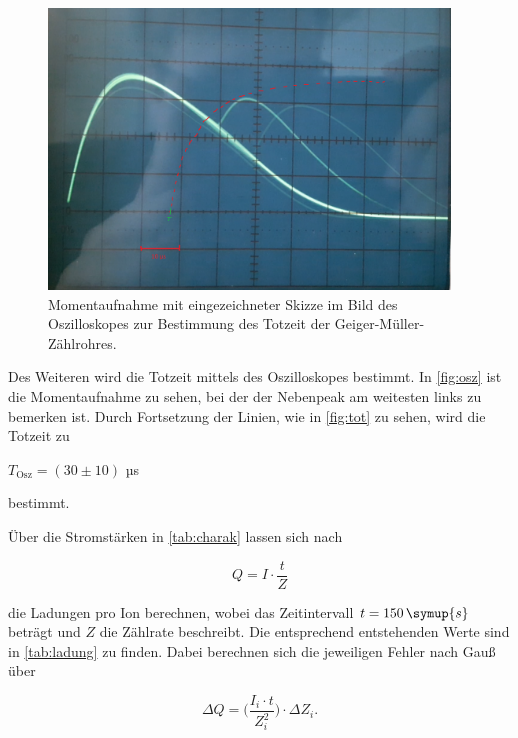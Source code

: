 \begin{figure}
  \centering
  \includegraphics[width=0.95\textwidth]{content/osz_m_skizze.png}
  \caption{Momentaufnahme mit eingezeichneter Skizze im Bild des Oszilloskopes zur Bestimmung des Totzeit der Geiger-Müller-Zählrohres.}
  \label{fig:osz-m-skizze}
\end{figure}

Des Weiteren wird die Totzeit mittels des Oszilloskopes bestimmt. In \autoref{fig:osz} ist die Momentaufnahme zu sehen, bei der der Nebenpeak am weitesten links zu bemerken ist.
Durch Fortsetzung der Linien, wie in \autoref{fig:tot} zu sehen, wird die Totzeit zu

\begin{center}
    $T_\text{Osz} = (30 \pm 10)$ µs
\end{center}

bestimmt.

Über die Stromstärken in \autoref{tab:charak} lassen sich nach 

\begin{equation}
    Q = I \cdot \frac{t}{Z}
\end{equation}

die Ladungen pro Ion berechnen, 
wobei das Zeitintervall $t = 150 \, \symup{s}$ beträgt und $Z$ die Zählrate beschreibt.
Die entsprechend entstehenden Werte sind in \autoref{tab:ladung} zu finden.
Dabei berechnen sich die jeweiligen Fehler nach Gauß über

\begin{equation}
    \Delta Q = \bigg( \frac{I_i \cdot t}{Z_i^2} \bigg) \cdot \Delta Z_i.
\end{equation}

